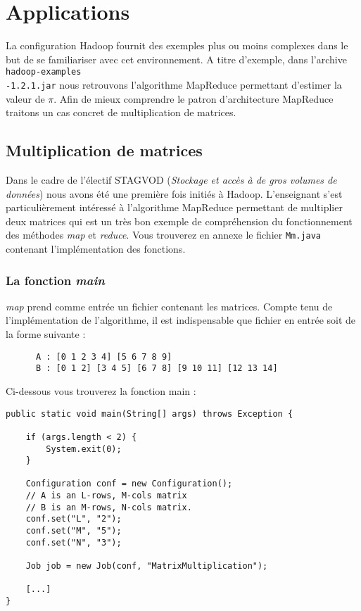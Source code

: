 \section{Applications}

\par La configuration Hadoop fournit des exemples plus ou moins complexes dans le but de se familiariser avec cet environnement. A titre d'exemple, dans l'archive \texttt{hadoop-examples\\-1.2.1.jar} nous retrouvons l'algorithme MapReduce permettant d'estimer la valeur de $\pi$. Afin de mieux comprendre le patron d'architecture MapReduce traitons un cas concret de multiplication de matrices.

\subsection{Multiplication de matrices}
\label{sec:matmult}

\par Dans le cadre de l'électif STAGVOD (\emph{Stockage et accès à de gros volumes de données}) nous avons été une première fois initiés à Hadoop. L'enseignant s'est particulièrement intéressé à l'algorithme MapReduce permettant de multiplier deux matrices qui est un très bon exemple de compréhension du fonctionnement des méthodes \emph{map} et \emph{reduce}. Vous trouverez en annexe le fichier \texttt{Mm.java} contenant l'implémentation des fonctions.

\subsubsection{La fonction \emph{main}}

\par \emph{map} prend comme entrée un fichier contenant les matrices. Compte tenu de l'implémentation de l'algorithme, il est indispensable que fichier en entrée soit de la forme suivante :

\begin{verbatim}
      A : [0 1 2 3 4] [5 6 7 8 9]
      B : [0 1 2] [3 4 5] [6 7 8] [9 10 11] [12 13 14]
\end{verbatim}

\par Ci-dessous vous trouverez la fonction main :

\begin{verbatim}
public static void main(String[] args) throws Exception {

	if (args.length < 2) {
		System.exit(0);
	}
	
	Configuration conf = new Configuration();
	// A is an L-rows, M-cols matrix
	// B is an M-rows, N-cols matrix.
	conf.set("L", "2");   
	conf.set("M", "5");
	conf.set("N", "3");

	Job job = new Job(conf, "MatrixMultiplication");
	
	[...]
}
\end{verbatim}

